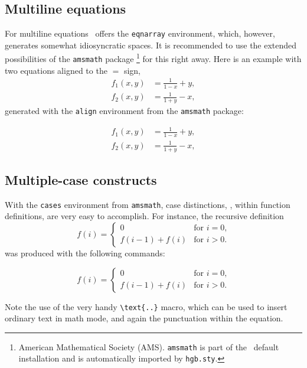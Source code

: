 \subsection{Multiline equations}

For multiline equations \latex\ offers the \verb!eqnarray! environment, which, however,
generates somewhat idiosyncratic spaces. It is recommended to use the extended
possibilities of the \texttt{amsmath} package%
\footnote{American Mathematical Society (AMS). \texttt{amsmath} is part of the 
\latex\ default installation and is automatically imported by \texttt{hgb.sty}.}
for this right away. Here is an example with two equations aligned to the $=$ sign,
%
\begin{align}
	f_1 (x,y) &= \frac{1}{1-x} + y , \label{eq:f1} \\
	f_2 (x,y) &= \frac{1}{1+y} - x , \label{eq:f2}
\end{align}
%
generated with the \texttt{align} environment from the \texttt{amsmath} package:
%
\begin{LaTeXCode}[numbers=none]
\begin{align}
  f_1 (x,y) &= \frac{1}{1-x} + y , \label{eq:f1} \\
  f_2 (x,y) &= \frac{1}{1+y} - x , \label{eq:f2}
\end{align}
\end{LaTeXCode}


\subsection{Multiple-case constructs}

With the \texttt{cases} environment from \texttt{amsmath}, case distinctions, 
\eg, within function definitions, are very easy to accomplish.
For instance, the recursive definition
%
\begin{equation}
	f(i) =
	\begin{cases}
		0             & \text{for $i = 0$,}\\
		f(i-1) + f(i) & \text{for $i > 0$.}
	\end{cases}
\end{equation}%
%
was produced with the following commands:
%
\begin{LaTeXCode}[numbers=none]
\begin{equation}
	f(i) =
	\begin{cases}
	  0             & \text{for $i = 0$,}\\
	  f(i-1) + f(i) & \text{for $i > 0$.}
	\end{cases}
\end{equation}
\end{LaTeXCode}
%
Note the use of the very handy \verb!\text{..}! macro, which can be used
to insert ordinary text in math mode, and again the punctuation within the
equation.


